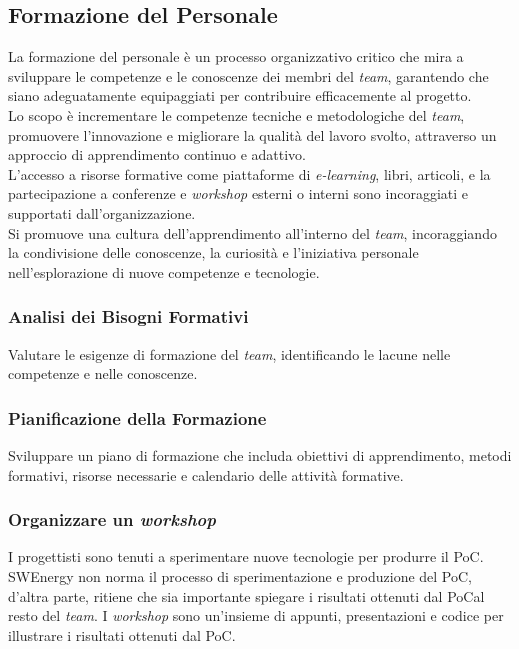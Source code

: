 \subsection{Formazione del Personale}

La formazione del personale è un processo organizzativo critico che mira a
sviluppare le competenze e le conoscenze dei membri del \textit{team}, garantendo che
siano adeguatamente equipaggiati per contribuire efficacemente al progetto.\\
Lo scopo è incrementare le competenze tecniche e metodologiche del \textit{team}, promuovere
l'innovazione e migliorare la qualità del lavoro svolto, attraverso un approccio
di apprendimento continuo e adattivo.\\
L'accesso a risorse formative come piattaforme di \textit{e-learning}, libri,
articoli, e la partecipazione a conferenze e \textit{workshop} esterni o interni
sono incoraggiati e supportati dall'organizzazione.\\
Si promuove una cultura dell'apprendimento all'interno del \textit{team}, incoraggiando
la condivisione delle conoscenze, la curiosità e l'iniziativa personale
nell'esplorazione di nuove competenze e tecnologie.



\subsubsection{Analisi dei Bisogni Formativi} 
Valutare le esigenze di
	  formazione del \textit{team}, identificando le lacune nelle competenze e nelle
	  conoscenze.

\subsubsection{Pianificazione della Formazione} 
Sviluppare un piano di
	  formazione che includa obiettivi di apprendimento, metodi formativi,
	  risorse necessarie e calendario delle attività formative.





\subsubsection{Organizzare un \textit{workshop}}
\label{organizzare-workshop}

I progettisti sono tenuti a sperimentare nuove tecnologie per produrre il PoC\g.
SWEnergy non norma il processo di sperimentazione e produzione del PoC\g, d'altra parte, ritiene che sia importante spiegare i risultati ottenuti dal PoC\g al resto del \textit{team}. I \textit{workshop} sono un'insieme di appunti, presentazioni e codice per illustrare i risultati ottenuti dal PoC\g.

